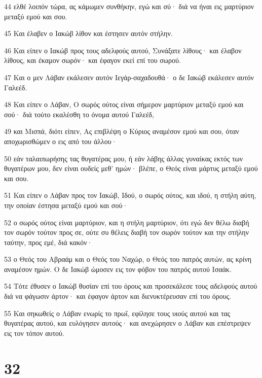 \par 44 ελθέ λοιπόν τώρα, ας κάμωμεν συνθήκην, εγώ και σύ· διά να ήναι εις μαρτύριον μεταξύ εμού και σου.
\par 45 Και έλαβεν ο Ιακώβ λίθον και έστησεν αυτόν στήλην.
\par 46 Και είπεν ο Ιακώβ προς τους αδελφούς αυτού, Συνάξατε λίθους· και έλαβον λίθους, και έκαμον σωρόν· και έφαγον εκεί επί του σωρού.
\par 47 Και ο μεν Λάβαν εκάλεσεν αυτόν Ιεγάρ-σαχαδουθά· ο δε Ιακώβ εκάλεσεν αυτόν Γαλεέδ.
\par 48 Και είπεν ο Λάβαν, Ο σωρός ούτος είναι σήμερον μαρτύριον μεταξύ εμού και σού· διά τούτο εκαλέσθη το όνομα αυτού Γαλεέδ,
\par 49 και Μισπά, διότι είπεν, Ας επιβλέψη ο Κύριος αναμέσον εμού και σου, όταν αποχωρισθώμεν ο εις από του άλλου·
\par 50 εάν ταλαιπωρήσης τας θυγατέρας μου, ή εάν λάβης άλλας γυναίκας εκτός των θυγατέρων μου, δεν είναι ουδείς μεθ' ημών· βλέπε, ο Θεός είναι μάρτυς μεταξύ εμού και σου.
\par 51 Και είπεν ο Λάβαν προς τον Ιακώβ, Ιδού, ο σωρός ούτος, και ιδού, η στήλη αύτη, την οποίαν έστησα μεταξύ εμού και σού·
\par 52 ο σωρός ούτος είναι μαρτύριον, και η στήλη μαρτύριον, ότι εγώ δεν θέλω διαβή τον σωρόν τούτον προς σε, ούτε συ θέλεις διαβή τον σωρόν τούτον και την στήλην ταύτην, προς εμέ, διά κακόν·
\par 53 ο Θεός του Αβραάμ και ο Θεός του Ναχώρ, ο Θεός του πατρός αυτών, ας κρίνη αναμέσον ημών. Ο δε Ιακώβ ώμοσεν εις τον φόβον του πατρός αυτού Ισαάκ.
\par 54 Τότε έθυσεν ο Ιακώβ θυσίαν επί του όρους και προσεκάλεσε τους αδελφούς αυτού διά να φάγωσιν άρτον· και έφαγον άρτον και διενυκτέρευσαν επί του όρους.
\par 55 Και σηκωθείς ο Λάβαν ενωρίς το πρωΐ, εφίλησε τους υιούς αυτού και τας θυγατέρας αυτού, και ευλόγησεν αυτούς· και ανεχώρησεν ο Λάβαν και επέστρεψεν εις τον τόπον αυτού.

\chapter{32}

